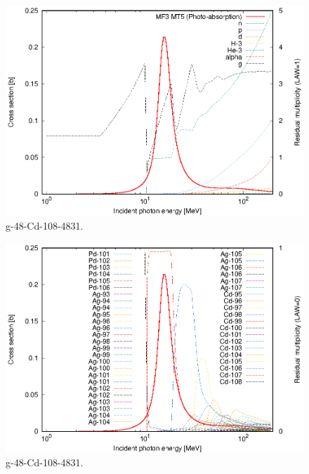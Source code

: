 \begin{figure}
 \includegraphics[width=\linewidth]{eps/g_48-Cd-108_4831.eps}
  \caption{g-48-Cd-108-4831.}
\end{figure}
\begin{figure}
 \includegraphics[width=\linewidth]{eps-law0/g_48-Cd-108_4831.eps}
 \caption{g-48-Cd-108-4831.}
\end{figure}
\newpage \clearpage

